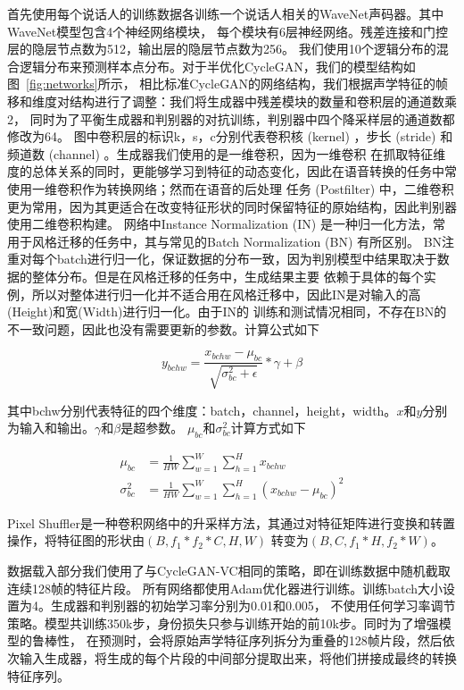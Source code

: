 首先使用每个说话人的训练数据各训练一个说话人相关的WaveNet声码器。其中WaveNet模型包含4个神经网络模块，
每个模块有6层神经网络。残差连接和门控层的隐层节点数为512，输出层的隐层节点数为256。
我们使用10个逻辑分布的混合逻辑分布来预测样本点分布。对于半优化CycleGAN，我们的模型结构如图~\ref{fig:networks}所示，
相比标准CycleGAN的网络结构，我们根据声学特征的帧移和维度对结构进行了调整：我们将生成器中残差模块的数量和卷积层的通道数乘2，
同时为了平衡生成器和判别器的对抗训练，判别器中四个降采样层的通道数都修改为64。
图中卷积层的标识k，s，c分别代表卷积核 (kernel) ，步长 (stride) 和频道数 (channel) 。生成器我们使用的是一维卷积，因为一维卷积
在抓取特征维度的总体关系的同时，更能够学习到特征的动态变化，因此在语音转换的任务中常使用一维卷积作为转换网络；然而在语音的后处理
任务 (Postfilter) 中，二维卷积更为常用，因为其更适合在改变特征形状的同时保留特征的原始结构，因此判别器使用二维卷积构建。
网络中Instance Normalization (IN) 是一种归一化方法，常用于风格迁移的任务中，其与常见的Batch Normalization (BN) 有所区别。
BN注重对每个batch进行归一化，保证数据的分布一致，因为判别模型中结果取决于数据的整体分布。但是在风格迁移的任务中，生成结果主要
依赖于具体的每个实例，所以对整体进行归一化并不适合用在风格迁移中，因此IN是对输入的高(Height)和宽(Width)进行归一化。由于IN的
训练和测试情况相同，不存在BN的不一致问题，因此也没有需要更新的参数。计算公式如下

\begin{equation}
    y_{bchw} = \frac{x_{bchw}-\mu_{bc}}{\sqrt{\sigma^2_{bc}+\epsilon}} * \gamma + \beta
\end{equation}

其中bchw分别代表特征的四个维度：batch，channel，height，width。$x$和$y$分别为输入和输出。$\gamma$和$\beta$是超参数。
$\mu_{bc}$和$\sigma^2_{bc}$计算方式如下

\begin{align}
    \mu_{bc} & = \frac{1}{HW}\sum^W_{w=1}\sum^H_{h=1}x_{bchw} \\
    \sigma^2_{bc} & = \frac{1}{HW}\sum^W_{w=1}\sum^H_{h=1}(x_{bchw}-\mu_{bc})^2
\end{align}

Pixel Shuffler是一种卷积网络中的升采样方法，其通过对特征矩阵进行变换和转置操作，将特征图的形状由$(B,f_1 * f_2 * C,H,W)$
转变为$(B,C,f_1 *H,f_2 *W)$。

数据载入部分我们使用了与CycleGAN-VC相同的策略，即在训练数据中随机截取连续128帧的特征片段。
所有网络都使用Adam优化器进行训练。训练batch大小设置为4。生成器和判别器的初始学习率分别为0.01和0.005，
不使用任何学习率调节策略。模型共训练350k步，身份损失只参与训练开始的前10k步。同时为了增强模型的鲁棒性，
在预测时，会将原始声学特征序列拆分为重叠的128帧片段，然后依次输入生成器，将生成的每个片段的中间部分提取出来，将他们拼接成最终的转换特征序列。

